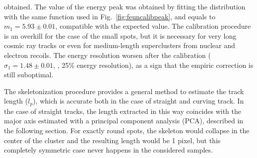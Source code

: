 obtained.  The value of the energy peak was obtained by fitting the
distribution with the same function used in
Fig.~\ref{fig:feuncalibpeak}, and equals to  $m_1 = 5.93 \pm 0.01$\keV,
compatible with the expected value. The calibration procedure is an
overkill for the case of the small \fe spots, but it is necessary for
very long cosmic ray tracks or even for medium-length superclusters
from nuclear and electron recoils.  The energy resolution worsen after
the calibration ($\sigma_1 = 1.48 \pm 0.01$, \ie, 25\% energy
resolution), as a sign that the empiric correction is still
suboptimal.
%
%

The skeletonization procedure provides a general method to estimate
the track length ($l_p$), which is accurate both in the case of straight
and curving track.  In the case of straight tracks, the length extracted
in this way coincides with the major axis estimated with a principal
component analysis (PCA), described in the following section. For
exactly round spots, the skeleton would collapse in the center of the
cluster and the resulting length would be 1 pixel, but this completely
symmetric case never happens in the considered samples.
